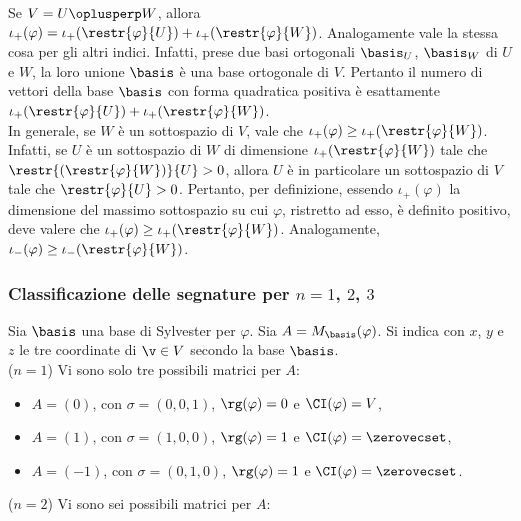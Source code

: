 \begin{remark}
	\li Se $V = U \oplusperp W$, allora $\iota_+(\varphi) = \iota_+(\restr{\varphi}{U}) + \iota_+(\restr{\varphi}{W})$.
	Analogamente vale la stessa cosa per gli altri indici. Infatti,
	prese due basi ortogonali $\basis_U$, $\basis_W$ di $U$ e $W$,
	la loro unione $\basis$ è una base ortogonale di $V$. Pertanto
	il numero di vettori della base $\basis$ con forma quadratica positiva
	è esattamente $\iota_+(\restr{\varphi}{U}) + \iota_+(\restr{\varphi}{W})$. \\
	
	\li In generale, se $W$ è un sottospazio di $V$, vale che $\iota_+(\varphi) \geq \iota_+(\restr{\varphi}{W})$.
	Infatti, se $U$ è un sottospazio di $W$ di dimensione $\iota_+(\restr{\varphi}{W})$ tale che
	$\restr{(\restr{\varphi}{W})}{U} > 0$, allora $U$ è in particolare un sottospazio di $V$ tale che $\restr{\varphi}{U} > 0$. Pertanto, per definizione, essendo $\iota_+(\varphi)$ la dimensione del massimo sottospazio su cui $\varphi$, ristretto ad esso, è definito positivo, deve valere che $\iota_+(\varphi) \geq \iota_+(\restr{\varphi}{W})$. Analogamente, $\iota_-(\varphi) \geq \iota_-(\restr{\varphi}{W})$.
\end{remark}

\subsubsection{Classificazione delle segnature per $n = 1$, $2$, $3$}

Sia $\basis$ una base di Sylvester per $\varphi$. Sia $A = M_\basis(\varphi)$. Si indica con $x$, $y$ e $z$
le tre coordinate di $\v \in V$ secondo la base $\basis$. \\

\mbox{($n = 1$)} Vi sono solo tre possibili matrici per $A$:

\begin{itemize}
	\item $A = (0)$, con $\sigma = (0, 0, 1)$, $\rg(\varphi) = 0$ e $\CI(\varphi) = V$,
	\item $A = (1)$, con $\sigma = (1, 0, 0)$, $\rg(\varphi) = 1$ e $\CI(\varphi) = \zerovecset$,
	\item $A = (-1)$, con $\sigma = (0, 1, 0)$, $\rg(\varphi) = 1$ e $\CI(\varphi) = \zerovecset$.
\end{itemize}

\vskip 0.1in

\mbox{($n = 2$)} Vi sono sei possibili matrici per $A$:

